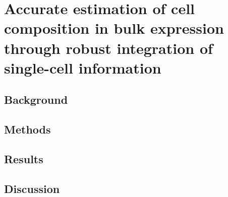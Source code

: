 \chapter{Accurate estimation of cell composition in bulk expression through robust integration of single-cell information}
\section{Background}
\section{Methods}
\section{Results}
\section{Discussion}